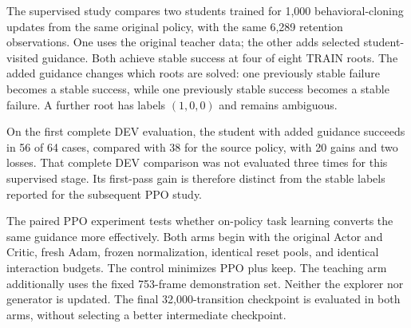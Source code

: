 \documentclass[
  american,
  11pt,
  a4paper,
]{article}
\begin{document}
The supervised study compares two students trained for 1,000
behavioral-cloning updates from the same original policy, with the same
6,289 retention observations. One uses the original teacher data; the
other adds selected student-visited guidance. Both achieve stable
success at four of eight TRAIN roots. The added guidance changes which
roots are solved: one previously stable failure becomes a stable
success, while one previously stable success becomes a stable failure. A
further root has labels \((1,0,0)\) and remains ambiguous.

On the first complete DEV evaluation, the student with added guidance
succeeds in 56 of 64 cases, compared with 38 for the source policy, with
20 gains and two losses. That complete DEV comparison was not evaluated
three times for this supervised stage. Its first-pass gain is therefore
distinct from the stable labels reported for the subsequent PPO study.

The paired PPO experiment tests whether on-policy task learning converts
the same guidance more effectively. Both arms begin with the original
Actor and Critic, fresh Adam, frozen normalization, identical reset
pools, and identical interaction budgets. The control minimizes PPO plus
keep. The teaching arm additionally uses the fixed 753-frame
demonstration set. Neither the explorer nor generator is updated. The
final 32,000-transition checkpoint is evaluated in both arms, without
selecting a better intermediate checkpoint.
\end{document}
